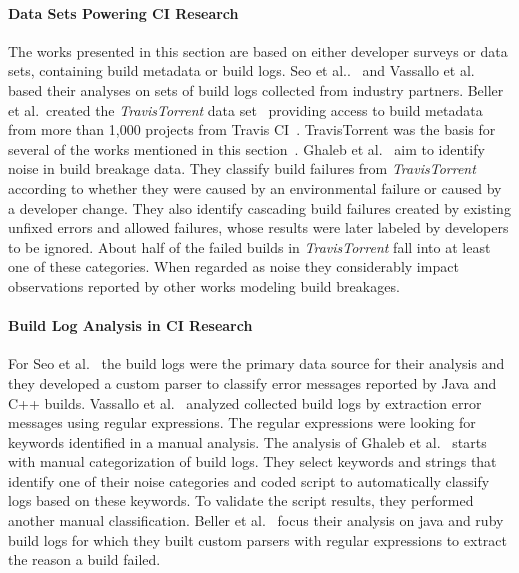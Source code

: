 \documentclass[\myrootdir/main.tex]{subfiles}
\begin{document}
\paragraph{Data Sets Powering CI Research}
The works presented in this section are based on either developer surveys or data sets, containing build metadata or build logs.
Seo et al..~\cite{seo2014programmers} and Vassallo et al.~\cite{vassallo2017a-tale} based their analyses on sets of build logs collected from industry partners.
Beller et al.\ created the \emph{TravisTorrent} data set~\cite{beller2017travistorrent} providing access to build metadata from more than 1,000 projects from Travis CI~\cite{travisci2019webpage}.
TravisTorrent was the basis for several of the works mentioned in this section~\cite{rausch2017empirical,zampetti2017open,vassallo2017a-tale,beller2017oops}.
Ghaleb et al.~\cite{ghaleb2019studying} aim to identify noise in build breakage data.
They classify build failures from \emph{TravisTorrent} according to whether they were caused by an environmental failure or caused by a developer change.
They also identify cascading build failures created by existing unfixed errors and allowed failures, whose results were later labeled by developers to be ignored.
About half of the failed builds in \emph{TravisTorrent} fall into at least one of these categories.
When regarded as noise they considerably impact observations reported by other works modeling build breakages.

\paragraph{Build Log Analysis in CI Research}
For Seo et al.~\cite{seo2014programmers} the build logs were the primary data source for their analysis and they developed a custom parser to classify error messages reported by Java and C++ builds. 
Vassallo et al.~\cite{vassallo2017a-tale} analyzed collected build logs by extraction error messages using regular expressions.
The regular expressions were looking for keywords identified in a manual analysis.
The analysis of Ghaleb et al.~\cite{ghaleb2019studying} starts with manual categorization of build logs.
They select keywords and strings that identify one of their noise categories and coded script to automatically classify logs based on these keywords.
To validate the script results, they performed another manual classification.
Beller et al.~\cite{beller2017oops} focus their analysis on java and ruby build logs for which they built custom parsers with regular expressions to extract the reason a build failed.
\end{document}
